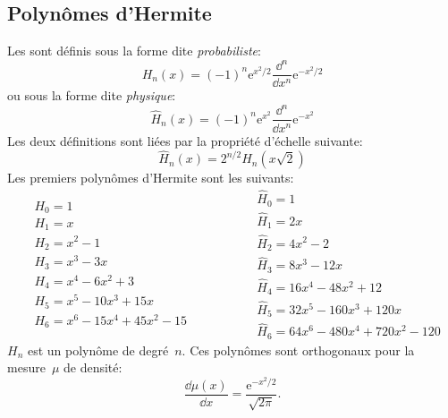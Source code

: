 \subsection{Polynômes d'Hermite} 
Les  sont définis sous la forme dite \emph{probabiliste}: 
\begin{equation}
 H_n(x)=(-1)^n \mathrm{e}^{x^2/2}\frac{\dd ^n}{\dd x^n}\mathrm{e}^{-x^2/2}
\end{equation}
ou sous la forme dite \emph{physique}: 
\begin{equation}
 \widehat{H}_n(x)=(-1)^n \mathrm{e}^{x^2}\frac{\dd^n}{\dd x^n}\mathrm{e}^{-x^2} 
\end{equation}
Les deux définitions sont liées par la propriété d'échelle suivante:
\begin{equation}
\widehat{H}_n(x) = 2^{n/2}H_n(x\sqrt{2})
\end{equation}
Les premiers polynômes d'Hermite sont les suivants:
\begin{equation}
\begin{aligned}
&H_0=1\\
&H_1=x\\
&H_2=x^2-1\\
&H_3=x^3-3x\\
&H_4=x^4-6x^2+3\\
&H_5=x^5-10x^3+15x\\
&H_6=x^6-15x^4+45x^2-15
\end{aligned}
\qquad\qquad\begin{aligned}
&\widehat{H}_0=1\\
&\widehat{H}_1=2x\\
&\widehat{H}_2=4x^2-2\\
&\widehat{H}_3=8x^3-12x\\
&\widehat{H}_4=16x^4-48x^2+12\\
&\widehat{H}_5=32x^5-160x^3+120x\\
&\widehat{H}_6=64x^6-480x^4+720x^2-120
\end{aligned}
\end{equation}
$H_n$ est un polynôme de degré~$n$. Ces polynômes sont orthogonaux pour la mesure~$\mu$ de densité: 
\begin{equation}
 \frac{\dd \mu(x)}{\dd x} = \frac{\mathrm{e}^{-x^2/2}}{\sqrt{2\pi}}. 
\end{equation}
